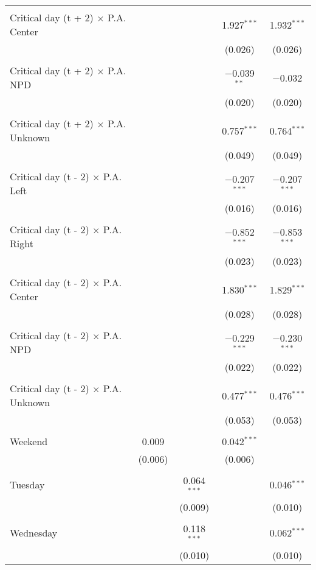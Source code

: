 \documentclass[
]{article}
\begin{document}
\begin{table}[!htbp]
{\begin{tabular}{@{\extracolsep{5pt}}lcccc}
  & & & & \\ 
 Critical day (t + 2) $\times$ P.A. Center &  &  & 1.927$^{***}$ & 1.932$^{***}$ \\ 
  &  &  & (0.026) & (0.026) \\ 
  & & & & \\ 
 Critical day (t + 2) $\times$ P.A. NPD &  &  & $-$0.039$^{**}$ & $-$0.032 \\ 
  &  &  & (0.020) & (0.020) \\ 
  & & & & \\ 
 Critical day (t + 2) $\times$ P.A. Unknown &  &  & 0.757$^{***}$ & 0.764$^{***}$ \\ 
  &  &  & (0.049) & (0.049) \\ 
  & & & & \\ 
 Critical day (t - 2) $\times$ P.A. Left &  &  & $-$0.207$^{***}$ & $-$0.207$^{***}$ \\ 
  &  &  & (0.016) & (0.016) \\ 
  & & & & \\ 
 Critical day (t - 2) $\times$ P.A. Right &  &  & $-$0.852$^{***}$ & $-$0.853$^{***}$ \\ 
  &  &  & (0.023) & (0.023) \\ 
  & & & & \\ 
 Critical day (t - 2) $\times$ P.A. Center &  &  & 1.830$^{***}$ & 1.829$^{***}$ \\ 
  &  &  & (0.028) & (0.028) \\ 
  & & & & \\ 
 Critical day (t - 2) $\times$ P.A. NPD &  &  & $-$0.229$^{***}$ & $-$0.230$^{***}$ \\ 
  &  &  & (0.022) & (0.022) \\ 
  & & & & \\ 
 Critical day (t - 2) $\times$ P.A. Unknown &  &  & 0.477$^{***}$ & 0.476$^{***}$ \\ 
  &  &  & (0.053) & (0.053) \\ 
  & & & & \\ 
 Weekend & 0.009 &  & 0.042$^{***}$ &  \\ 
  & (0.006) &  & (0.006) &  \\ 
  & & & & \\ 
 Tuesday &  & 0.064$^{***}$ &  & 0.046$^{***}$ \\ 
  &  & (0.009) &  & (0.010) \\ 
  & & & & \\ 
 Wednesday &  & 0.118$^{***}$ &  & 0.062$^{***}$ \\ 
  &  & (0.010) &  & (0.010) \\ 

\end{tabular}}
\end{table}
\end{document}
